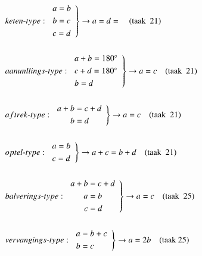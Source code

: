 ~\phantom{a}

\vfill
\begin{figure}[H]
\centering
{%
\begin{align*}
& keten\text{-}type : 
\left.\begin{array}{l}
a= b\\[3pt]
b=c\\[3pt]
c=d
\end{array}\right\}
\to a=d =\quad(\text{taak~ }21)\\[.5cm]
& aanunllings\text{-}type: 
\left.\begin{array}{l}
a+b=180^{\circ}\\[3pt]
c+d=180^{\circ}\\[3pt]
b=d
\end{array}\right\}
\to a=c\quad(\text{taak~ } 21)\\[.5cm]
& aftrek\text{-}type :
\left.\begin{array}{r@{\;=\;}l}
a+b & c+d\\[3pt]
b & d
\end{array}
\right\} \to a=c \quad (\text{taak~ }21)\\[.5cm]
& optel\text{-}type: 
\left.
\begin{array}{l}
a=b\\[3pt]
c=d
\end{array}\right\}
\to a+c=b+d\quad(\text{taak~ } 21)\\[.5cm]
& balverings\text{-}type:
\left.
\begin{array}{r@{\;=\;}l}
a+b & c+d\\[3pt]
a & b\\[3pt]
c & d
\end{array}
\right\}
\to a=c\quad(\text{taak~ } 25)\\[.5cm]
& vervangings\text{-}type:
\left.
\begin{array}{l}
a=b+c\\[3pt]
b=c
\end{array}
\right\}
\to a=2b\quad\text{(taak 25)}
\end{align*}}\relax
\caption{}\label{chap6-fig2}
\end{figure}

\vfill\eject

~\phantom{a}

